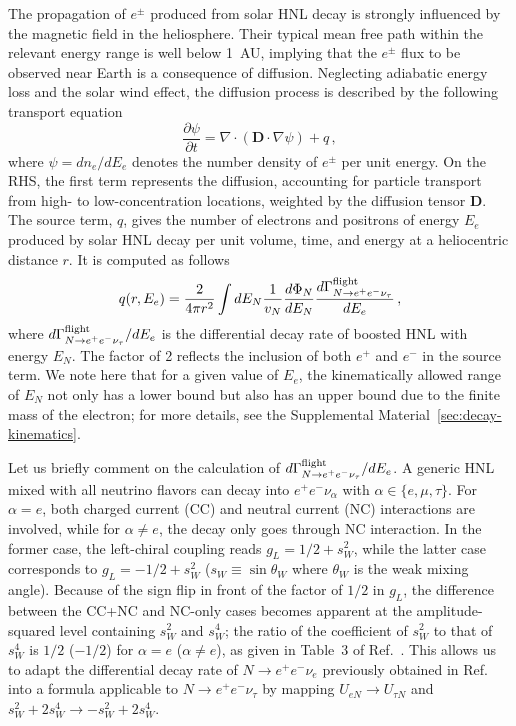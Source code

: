 \documentclass[aps,prd,twocolumn,preprintnumbers,superscriptaddress,nofootinbib]{revtex4-1}
\begin{document}
The propagation of $e^\pm$ produced from solar HNL decay is strongly influenced by the magnetic field in the heliosphere. 
Their typical mean free path within the relevant energy range is well below 1~AU, implying that the $e^{\pm}$ flux to be observed near Earth is a consequence of diffusion. Neglecting adiabatic energy loss and the solar wind effect, the diffusion process is described by the following transport equation~\cite{Engelbrecht2022S}
\begin{equation}
    \frac{\partial \psi}{\partial t} = \nabla \cdot (\textbf{D}\cdot\nabla \psi) + q \,,
    \label{eq:psi_diffusion}
\end{equation}
where $\psi=dn_e/dE_e$ denotes the number density of $e^{\pm}$ per unit energy. On the RHS, the first term represents the diffusion, accounting for particle transport from high- to low-concentration locations, weighted by the diffusion tensor $\textbf{D}$. 
The source term, $q$, gives the number of electrons and positrons of energy $E_e$ produced by solar HNL decay per unit volume, time, and energy at a heliocentric distance $r$. It is computed as follows \cite{Drewes:2024dem}
\begin{equation}
q(r,E_e) = \frac{2}{4\pi r^{2}}\int dE_{N}\frac{1}{v_{N}}\frac{d\Phi_{N}}{dE_{N}}\frac{d\Gamma^{\rm flight}_{N \to e^+ e^- \nu_\tau }}{dE_{e}}\,,
\label{eq:src_q}
\end{equation} 
where ${d\Gamma^{\rm flight}_{N \to e^+ e^- \nu_\tau }}/{dE_e}$ is the differential decay rate of boosted HNL with energy $E_N$. The factor of 2 reflects the inclusion of both $e^+$ and $e^-$ in the source term.  
We note here that for a given value of $E_e$, the kinematically allowed range of $E_N$ not only has a lower bound but also has an upper bound due to the finite mass of the electron; for more details, see the Supplemental Material~\ref{sec:decay-kinematics}.

Let us briefly comment on the calculation of ${d\Gamma^{\rm flight}_{N \to e^+ e^- \nu_\tau }}/{dE_{e}}$.
A generic HNL mixed with all neutrino flavors can decay into $e^+  e^-\nu_\alpha$ with $\alpha\in \{e,\mu,\tau\}$. 
For $\alpha=e$, both charged current (CC) and neutral current (NC) interactions are involved, while for  $\alpha\neq e$, the decay only goes through NC interaction. 
In the former case, the left-chiral coupling reads $g_L={1}/{2}+s_W^2$, while the latter case corresponds to $g_L=-{1}/{2}+s_W^2$ ($s_W\equiv \sin \theta_W$ where $\theta_W$ is the weak mixing angle). 
Because of the sign flip in front of the factor of $1/2$ in $g_L$, the difference between the CC+NC and NC-only cases becomes apparent at the amplitude-squared level containing $s_W^2$ and $s_W^4$; the ratio of the coefficient of $s_W^2$ to that of $s_W^4$ is $1/2$ ($-1/2$) for $\alpha = e$ ($\alpha \neq e$), as given in Table~3 of Ref.~\cite{Bondarenko:2018ptm}. 
This allows us to adapt the differential decay rate of $N \to e^+ e^- \nu_e$ previously obtained in Ref.~\cite{Drewes:2024dem} into a formula applicable to $N \to e^+ e^- \nu_\tau$ by  mapping $U_{eN} \to U_{\tau N}$ and $s_W^2 + 2 s_W^4 \to -s_W^2 + 2 s_W^4$.
\end{document}
